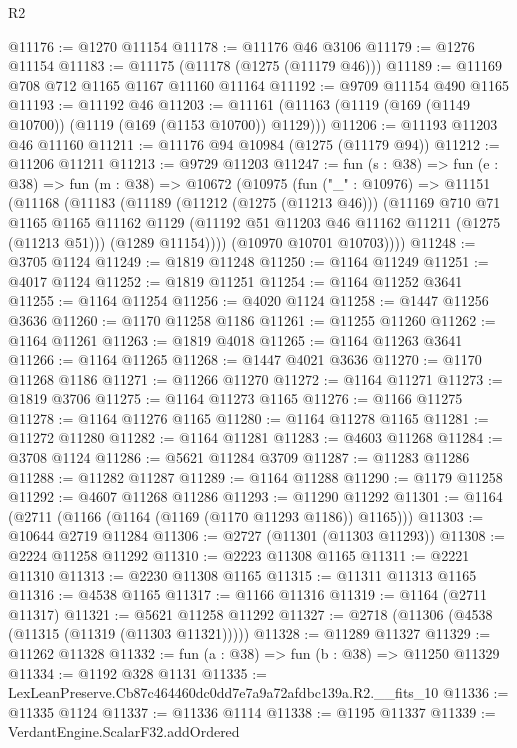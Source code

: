 \begin{lexlean}{R2}
\begin{coremodule}
@11176 := @1270 @11154
@11178 := @11176 @46 @3106
@11179 := @1276 @11154
@11183 := @11175 (@11178 (@1275 (@11179 @46)))
@11189 := @11169 @708 @712 @1165 @1167 @11160 @11164
@11192 := @9709 @11154 @490 @1165
@11193 := @11192 @46
@11203 := @11161 (@11163 (@1119 (@169 (@1149 @10700)) (@1119 (@169 (@1153 @10700)) @1129)))
@11206 := @11193 @11203 @46 @11160
@11211 := @11176 @94 @10984 (@1275 (@11179 @94))
@11212 := @11206 @11211
@11213 := @9729 @11203
@11247 := fun (s : @38) =>
  fun (e : @38) =>
  fun (m : @38) =>
  @10672
    (@10975
      (fun ("_" : @10976) =>
      @11151
        (@11168
          (@11183
            (@11189
              (@11212 (@1275 (@11213 @46)))
              (@11169
                @710
                @71
                @1165
                @1165
                @11162
                @1129
                (@11192 @51 @11203 @46 @11162 @11211 (@1275 (@11213 @51)))
                (@1289 @11154))))
          (@10970 @10701 @10703))))
@11248 := @3705 @1124
@11249 := @1819 @11248
@11250 := @1164 @11249
@11251 := @4017 @1124
@11252 := @1819 @11251
@11254 := @1164 @11252 @3641
@11255 := @1164 @11254
@11256 := @4020 @1124
@11258 := @1447 @11256 @3636
@11260 := @1170 @11258 @1186
@11261 := @11255 @11260
@11262 := @1164 @11261
@11263 := @1819 @4018
@11265 := @1164 @11263 @3641
@11266 := @1164 @11265
@11268 := @1447 @4021 @3636
@11270 := @1170 @11268 @1186
@11271 := @11266 @11270
@11272 := @1164 @11271
@11273 := @1819 @3706
@11275 := @1164 @11273 @1165
@11276 := @1166 @11275
@11278 := @1164 @11276 @1165
@11280 := @1164 @11278 @1165
@11281 := @11272 @11280
@11282 := @1164 @11281
@11283 := @4603 @11268
@11284 := @3708 @1124
@11286 := @5621 @11284 @3709
@11287 := @11283 @11286
@11288 := @11282 @11287
@11289 := @1164 @11288
@11290 := @1179 @11258
@11292 := @4607 @11268 @11286
@11293 := @11290 @11292
@11301 := @1164 (@2711 (@1166 (@1164 (@1169 (@1170 @11293 @1186)) @1165)))
@11303 := @10644 @2719 @11284
@11306 := @2727 (@11301 (@11303 @11293))
@11308 := @2224 @11258 @11292
@11310 := @2223 @11308 @1165
@11311 := @2221 @11310
@11313 := @2230 @11308 @1165
@11315 := @11311 @11313 @1165
@11316 := @4538 @1165
@11317 := @1166 @11316
@11319 := @1164 (@2711 @11317)
@11321 := @5621 @11258 @11292
@11327 := @2718 (@11306 (@4538 (@11315 (@11319 (@11303 @11321)))))
@11328 := @11289 @11327
@11329 := @11262 @11328
@11332 := fun (a : @38) => fun (b : @38) => @11250 @11329
@11334 := @1192 @328 @1131
@11335 := LexLeanPreserve.Cb87c464460dc0dd7e7a9a72afdbc139a.R2.__fits_10
@11336 := @11335 @1124
@11337 := @11336 @1114
@11338 := @1195 @11337
@11339 := VerdantEngine.ScalarF32.addOrdered

\end{coremodule}
\end{lexlean}
